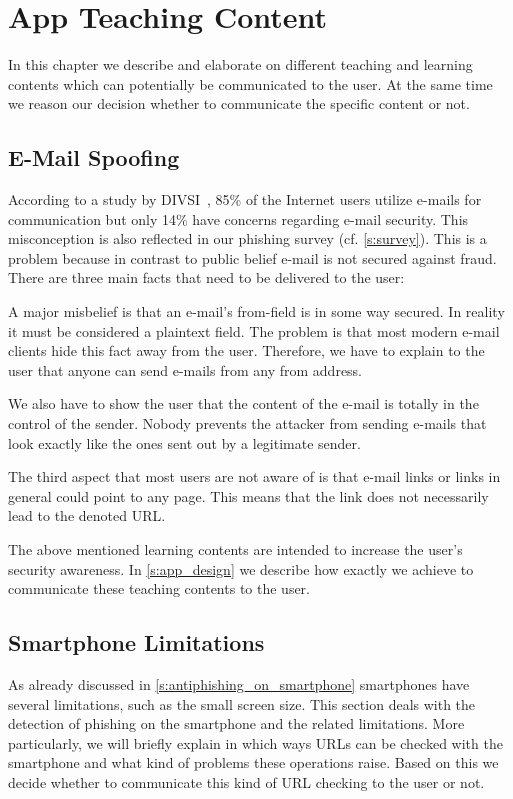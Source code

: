 \section{App Teaching Content}

In this chapter we describe and elaborate on different teaching and learning contents which can potentially be communicated to the user.
 At the same time we reason our decision whether to communicate the specific content or not.


\subsection{E-Mail Spoofing}
According to a study by DIVSI~\cite{divsi2012divsi}, 85\% of the Internet users utilize e-mails for communication but only 14\% have concerns regarding e-mail security.
This misconception is also reflected in our phishing survey (cf. \autoref{s:survey}).
This is a problem because in contrast to public belief e-mail is not secured against fraud. There are three main facts that need to be delivered to the user:
\begin{description}[leftmargin=0cm]
	\item[From Field:] A major misbelief is that an e-mail's from-field is in some way secured.
	In reality it must be considered a plaintext field.
	The problem is that most modern e-mail clients hide this fact away from the user.
	Therefore, we have to explain to the user that anyone can send e-mails from any from address. 
	\item[E-Mail Content:] We also have to show the user that the content of the e-mail is totally in the control of the sender.
	Nobody prevents the attacker from sending e-mails that look exactly like the ones sent out by a legitimate sender.
	\item[Links in E-Mails:] The third aspect that most users are not aware of is that e-mail links or links in general could point to any page. 
	This means that the link does not necessarily lead to the denoted URL.
\end{description}
The above mentioned learning contents are intended to increase the user's security awareness.
In \autoref{s:app_design} we describe how exactly we achieve to communicate these teaching contents to the user.

\subsection{Smartphone Limitations}
As already discussed in \autoref{s:antiphishing_on_smartphone} smartphones have several limitations, such as the small screen size. 
This section deals with the detection of phishing on the smartphone and the related limitations.
More particularly, we will briefly explain in which ways URLs can be checked with the smartphone and what kind of problems these operations raise.
Based on this we decide whether to communicate this kind of URL checking to the user or not.

